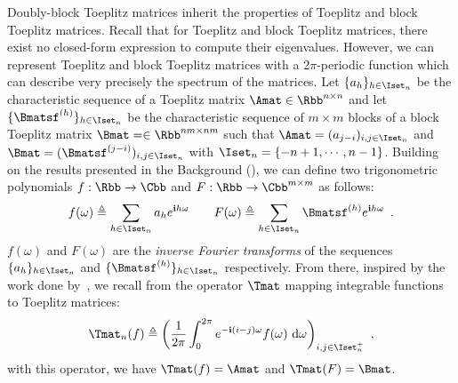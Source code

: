 Doubly-block Toeplitz matrices inherit the properties of Toeplitz and block Toeplitz matrices.
Recall that for Toeplitz and block Toeplitz matrices, there exist no closed-form expression to compute their eigenvalues.
However, we can represent Toeplitz and block Toeplitz matrices with a 2$\pi$-periodic function which can describe very precisely the spectrum of the matrices. 
Let $\{a_h\}_{h \in \Iset_n}$ be the characteristic sequence of a Toeplitz matrix $\Amat \in \Rbb^{n \times n}$ and let $\{\Bmatsf^{(h)}\}_{h \in \Iset_n}$ be the characteristic sequence of $m \times m$ blocks of a block Toeplitz matrix $\Bmat = \in \Rbb^{nm \times nm}$ such that $\Amat = (a_{j-i})_{i,j\in \Iset_n}$ and $\Bmat = (\Bmatsf^{(j-i)})_{i,j \in \Iset_n}$ with $\Iset_n = \left\{ -n+1, \cdots, n-1 \right\}$.
Building on the results presented in the Background (), we can define two trigonometric polynomials $f: \Rbb \rightarrow \Cbb$ and $F: \Rbb \rightarrow \Cbb^{m \times m}$ as follows:
\begin{equation}
  f(\omega) \triangleq \sum_{h \in \Iset_n} a_h e^{\ci h \omega} \quad \quad F(\omega) \triangleq \sum_{h \in \Iset_n} \Bmatsf^{(h)} e^{\ci h \omega} \enspace.
\end{equation}
$f(\omega)$  and $F(\omega)$ are the \emph{inverse Fourier transforms} of the sequences $\{a_h\}_{h \in \Iset_n}$ and $\{\Bmatsf^{(h)}\}_{h \in \Iset_n}$ respectively.
From there, inspired by the work done by~\citet{grenander1958toeplitz}, we recall from  the operator $\Tmat$ mapping integrable functions to Toeplitz matrices:
\begin{equation} \label{equation:expression_toeplitz_matrix}
  \Tmat_n(f) \triangleq\leftmat\frac{1}{2\pi} \int_{0}^{2\pi} e^{-\ci(i-j)\omega} f(\omega) \,\diff \omega \rightmat_{i,j \in \Iset^+_n} \enspace,
\end{equation}
with this operator, we have $\Tmat(f) = \Amat$ and $\Tmat(F) = \Bmat$.

